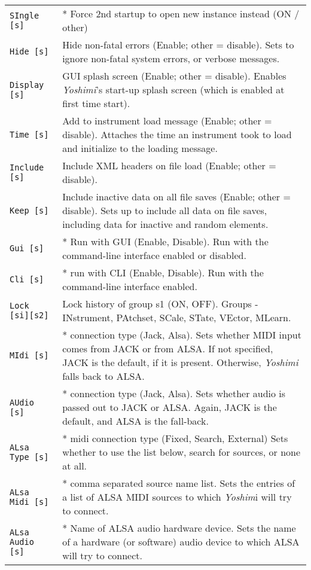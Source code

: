 \begin{center}
\begin{longtable}{p{4cm} p{10cm}}
\texttt{SIngle [s]} &
   * Force 2nd startup to open new instance instead (ON / other)\\
\texttt{Hide [s]} &
   Hide non-fatal errors (Enable; other = disable).
   Sets to ignore non-fatal system errors, or verbose messages. \\
\texttt{Display [s]} &
   GUI splash screen (Enable; other = disable).
   Enables \textsl{Yoshimi}'s start-up splash screen (which is
   enabled at first time start). \\
\texttt{Time [s]} &
   Add to instrument load message (Enable; other = disable).
   Attaches the time an instrument took to load and initialize to the loading
   message. \\
\texttt{Include [s]} &
   Include XML headers on file load (Enable; other = disable). \\
\texttt{Keep [s]} &
   Include inactive data on all file saves (Enable; other = disable).
   Sets up to include all data on file saves, including data for
   inactive and random elements. \\
\texttt{Gui [s]} &
   * Run with GUI (Enable, Disable).
   Run with the command-line interface enabled or disabled.  \\
\texttt{Cli [s]} &
   * run with CLI (Enable, Disable).
   Run with the command-line interface enabled. \\
\texttt{Lock [si][s2]} &
   Lock history of group s1 (ON, OFF).
   Groups - INstrument, PAtchset, SCale, STate, VEctor, MLearn. \\
\texttt{MIdi [s]} &
   * connection type (Jack, Alsa).
   Sets whether MIDI input comes from JACK or from ALSA.
   If not specified, JACK is the default, if it is present.  Otherwise,
   \textsl{Yoshimi} falls back to ALSA. \\
\texttt{AUdio [s]} &
   * connection type (Jack, Alsa).
   Sets whether audio is passed out to JACK or ALSA.  Again, JACK is the
   default, and ALSA is the fall-back.  \\
\texttt{ALsa Type [s]} &
   * midi connection type (Fixed, Search, External)
   Sets whether to use the list below, search for sources, or none at all. \\
\texttt{ALsa Midi [s]} &
   * comma separated source name list.
   Sets the entries of a list of ALSA MIDI sources to which
   \textsl{Yoshim}i will try to connect.  \\
\texttt{ALsa Audio [s]} &
   * Name of ALSA audio hardware device.
   Sets the name of a hardware (or software)
   audio device to which ALSA will try to connect.  \\

\end{longtable}
\end{center}

